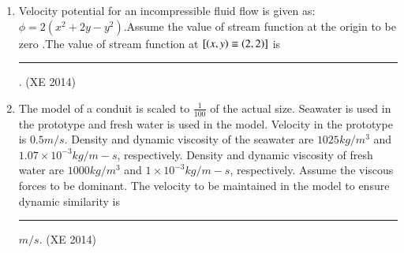 \documentclass[journal,12pt,onecolumn]{IEEEtran}
\theoremstyle{remark}
\begin{document}
\begin{enumerate}
\begin{multicols}{4}
\begin{enumerate}
\item $\frac{k_1 + k_2}{r}$
\item $\frac{\sqrt{{k_1}^2 + {k_2}^2}}{r}$
\item a constant
\item proportional to $r^{-3}$ .

\end{enumerate}
\end{multicols}

\item Velocity potential for an incompressible fluid flow is given as: $ \phi = 2(x^2 + 2y - y^2)$.Assume the 
value of stream function at the origin to be zero .The value of stream function at $[\left(x,y\right) \equiv \left(2,2\right)]$ is \rule{2cm}{0.4pt} .
\hfill{(XE 2014)}

\item The model of a conduit is scaled to $\frac{1}{100}$ of the actual size. Seawater is used in the prototype and fresh water is used in the model. Velocity in the prototype is $0.5 m/s$. Density and dynamic viscosity of the seawater are $1025 kg/m^3$ and $1.07 \times 10^{-3} kg/m-s$, respectively. Density and dynamic viscosity of fresh water are $1000 kg/m^{3}$ and $1 \times 10^{-3} kg/m-s$, respectively. Assume the viscous forces to be dominant. The velocity to be maintained in the model to ensure dynamic similarity is \rule{2cm}{0.4pt} $m/s$. 
\hfill{(XE 2014)}
\end{enumerate}
\end{document}
